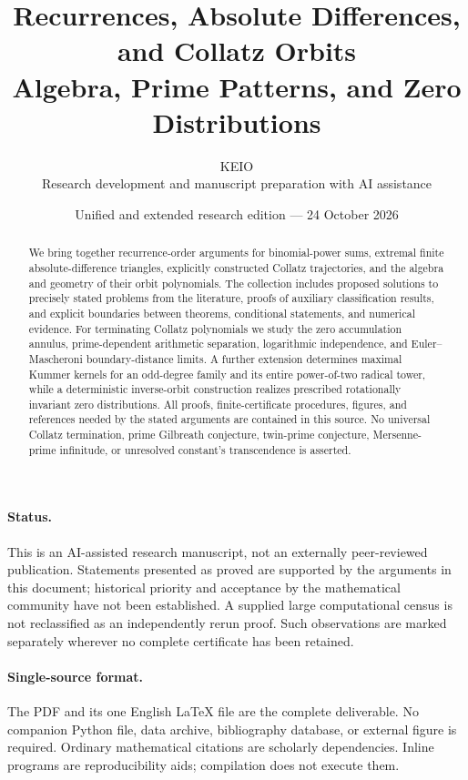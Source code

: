 \documentclass[11pt,a4paper]{article}
\title{\sffamily\bfseries\color{ink}Recurrences, Absolute Differences,\\and Collatz Orbits\\[8pt]\large Algebra, Prime Patterns, and Zero Distributions}
\author{KEIO\\\small Research development and manuscript preparation with AI assistance}
\date{Unified and extended research edition --- 24 October 2026}
\theoremstyle{definition}
\theoremstyle{remark}
\numberwithin{equation}{section}
\begin{document}
\maketitle
\begin{abstract}
We bring together recurrence-order arguments for binomial-power sums,
extremal finite absolute-difference triangles, explicitly constructed Collatz
trajectories, and the algebra and geometry of their orbit polynomials.
The collection includes proposed solutions to precisely stated problems
from the literature, proofs of auxiliary classification results, and explicit
boundaries between theorems, conditional statements, and numerical evidence.
For terminating Collatz polynomials we study the zero accumulation annulus,
prime-dependent arithmetic separation, logarithmic independence, and
Euler--Mascheroni boundary-distance limits. A further extension determines
maximal Kummer kernels for an odd-degree family and its entire power-of-two
radical tower, while a deterministic inverse-orbit construction realizes
prescribed rotationally invariant zero distributions. All proofs,
finite-certificate procedures, figures, and references needed by the
stated arguments are contained in this source. No universal Collatz
termination, prime Gilbreath conjecture, twin-prime conjecture, Mersenne-prime
infinitude, or unresolved constant's transcendence is asserted.
\end{abstract}
\paragraph{Status.}
This is an AI-assisted research manuscript, not an externally peer-reviewed
publication. Statements presented as proved are supported by the arguments
in this document; historical priority and acceptance by the mathematical
community have not been established. A supplied large computational census
is not reclassified as an independently rerun proof. Such observations are
marked separately wherever no complete certificate has been retained.
\paragraph{Single-source format.}
The PDF and its one English \LaTeX{} file are the complete deliverable.
No companion Python file, data archive, bibliography database, or external
figure is required. Ordinary mathematical citations are scholarly dependencies.
Inline programs are reproducibility aids; compilation does not execute them.
\clearpage
{\small\setlength{\parskip}{0pt}\setcounter{tocdepth}{2}\tableofcontents}
\clearpage
\end{document}
